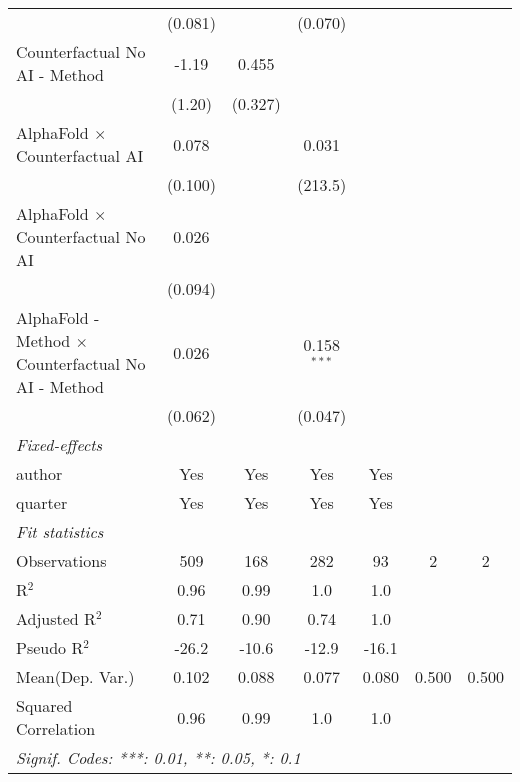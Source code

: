 \begin{tabular}{lcccccc}
                                                              & (0.081) &              & (0.070)       &           &     &   \\   
   Counterfactual No AI - Method                              & -1.19   & 0.455        &               &           &     &   \\   
                                                              & (1.20)  & (0.327)      &               &           &     &   \\   
   AlphaFold $\times$ Counterfactual AI                       & 0.078   &              & 0.031         &           &     &   \\   
                                                              & (0.100) &              & (213.5)       &           &     &   \\   
   AlphaFold $\times$ Counterfactual No AI                    & 0.026   &              &               &           &     &   \\   
                                                              & (0.094) &              &               &           &     &   \\   
   AlphaFold - Method $\times$ Counterfactual No AI - Method  & 0.026   &              & 0.158$^{***}$ &           &     &   \\   
                                                              & (0.062) &              & (0.047)       &           &     &   \\   
   \midrule
   \emph{Fixed-effects}\\
   author                                                     & Yes     & Yes          & Yes           & Yes       &     & \\  
   quarter                                                    & Yes     & Yes          & Yes           & Yes       &     & \\  
   \midrule
   \emph{Fit statistics}\\
   Observations                                               & 509     & 168          & 282           & 93        & 2   & 2\\  
   R$^2$                                                      & 0.96    & 0.99         & 1.0           & 1.0       &     & \\  
   Adjusted R$^2$                                             & 0.71    & 0.90         & 0.74          & 1.0       &     & \\  
   Pseudo R$^2$                                               & -26.2   & -10.6        & -12.9         & -16.1     &     & \\  
Mean(Dep. Var.) & 0.102 & 0.088 & 0.077 & 0.080 & 0.500 & 0.500 \\
   Squared Correlation                                        & 0.96    & 0.99         & 1.0           & 1.0       &     & \\  
   \midrule \midrule
   \multicolumn{7}{l}{\emph{Signif. Codes: ***: 0.01, **: 0.05, *: 0.1}}\\
\end{tabular}
\par\endgroup
